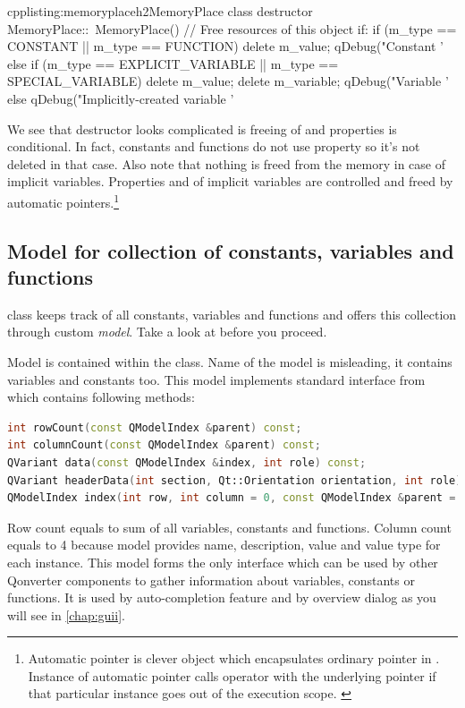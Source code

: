 \begin{fdoccode}{cpp}{listing:memoryplaceh2}{MemoryPlace class destructor}
MemoryPlace::~MemoryPlace() {
  // Free resources of this object if:
  if (m_type == CONSTANT || m_type == FUNCTION) {
    delete m_value;
    qDebug("Constant '%
  }
  else if (m_type == EXPLICIT_VARIABLE || m_type == SPECIAL_VARIABLE) {
    delete m_value;
    delete m_variable;
    qDebug("Variable '%
  }
  else {
    qDebug("Implicitly-created variable '%
  }
}
\end{fdoccode}
We see that destructor looks complicated is freeing of and properties is conditional. In fact, constants and functions do not use property so it's not deleted in that case. Also note that nothing is freed from the memory in case of implicit variables. Properties and of implicit variables are controlled and freed by automatic pointers.\footnote{Automatic pointer is clever object which encapsulates ordinary pointer in \cpp. Instance of automatic pointer calls operator with the underlying pointer if that particular instance goes out of the execution scope. \citep[p.~969-978]{prata:cprimer}}

\subsection{Model for collection of constants, variables and functions}
 class keeps track of all constants, variables and functions and offers this collection through custom \textit{model}. Take a look at \citep[keyword Model/View Programming]{various:qtdoc} before you proceed.

Model is contained within the class. Name of the model is misleading, it contains variables and constants too. This model implements standard interface from which contains following methods:
\begin{lstlisting}[language=cpp,firstnumber=1]
int rowCount(const QModelIndex &parent) const;
int columnCount(const QModelIndex &parent) const;
QVariant data(const QModelIndex &index, int role) const;
QVariant headerData(int section, Qt::Orientation orientation, int role) const;
QModelIndex index(int row, int column = 0, const QModelIndex &parent = QModelIndex()) const;
\end{lstlisting}
Row count equals to sum of all variables, constants and functions. Column count equals to 4 because model provides name, description, value and value type for each instance. This model forms the only interface which can be used by other Qonverter components to gather information about variables, constants or functions. It is used by auto-completion feature and by overview dialog as you will see in \autoref{chap:guii}.

